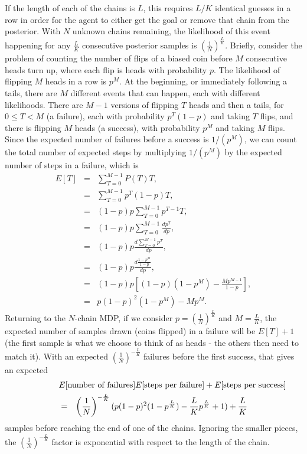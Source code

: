 If the length of each of the chains is $L$, this requires $L/K$ identical guesses in a row in order for the agent to either get the goal or remove that chain from the posterior. With $N$ unknown chains remaining, the likelihood of this event happening for any $\frac L K$ consecutive posterior samples is $(\frac 1 N)^\frac L K$. Briefly, consider the problem of counting the number of flips of a biased coin before $M$ consecutive heads turn up, where each flip is heads with probability $p$. The likelihood of flipping $M$ heads in a row is $p^M$. At the beginning, or immediately following a tails, there are $M$ different events that can happen, each with different likelihoods. There are $M-1$ versions of flipping $T$ heads and then a tails, for $0\leq T < M$ (a failure), each with probability $p^T(1-p)$ and taking $T$ flips, and there is flipping $M$ heads (a success), with probability $p^M$ and taking $M$ flips. Since the expected number of failures before a success is $1/(p^M)$, we can count the total number of expected steps by multiplying $1/(p^M)$ by the expected number of steps in a failure, which is
\begin{eqnarray}
E[T] &=& \sum_{T=0}^{M-1} P(T) T,\\
 &=& \sum_{T=0}^{M-1} p^T (1-p) T,\\
 &=&  (1-p)p \sum_{T=0}^{M-1} p^{T-1} T,\\
 &=&  (1-p)p \sum_{T=0}^{M-1} \frac {d p^T} {d p},\\
 &=&  (1-p)p \frac {d \sum_{T=0}^{M-1} p^T} {d p},\\
 &=&  (1-p)p \frac {d \frac {1-p^M}{1-p}} {d p},\\
 &=&  (1-p)p \left[ (1-p)(1-p^M)-\frac{Mp^{M-1}}{1-p}\right],\\
 &=&  p(1-p)^2(1-p^M)-Mp^{M}.
\end{eqnarray}
Returning to the $N$-chain MDP, if we consider $p=(\frac 1 N)^\frac L K$ and $M=\frac L K$, the expected number of samples drawn (coins flipped) in a failure will be $E[T]+1$ (the first sample is what we choose to think of as heads - the others then need to match it). With an expected $(\frac 1 N)^{-\frac L K}$ failures before the first success, that gives an expected 
\begin{eqnarray}
\lefteqn{E[\mbox{number of failures}]E[\mbox{steps per failure}]+E[\mbox{steps per success}]}\\
 &=& \left(\frac 1 N\right)^{-\frac L K} (p(1-p)^2(1-p^{\frac L K})-{\frac L K}p^{\frac L K}+1) + \frac L K
\end{eqnarray} samples before reaching the end of one of the chains. Ignoring the smaller pieces, the $(\frac 1 N)^{-\frac L K}$ factor is exponential with respect to the length of the chain.

